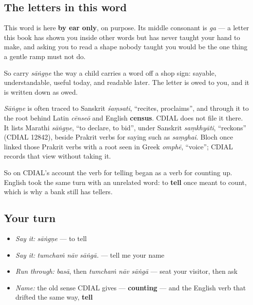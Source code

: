 \subsection*{The letters in this word}
This word is here \textbf{by ear only}, on purpose. Its middle consonant is \emph{ga} — a letter this book has shown you inside other words but has never taught your hand to make, and asking you to read a shape nobody taught you would be the one thing a gentle ramp must not do.

So carry \emph{sāṅgṇe} the way a child carries a word off a shop sign: sayable, understandable, useful today, and readable later. The letter is owed to you, and it is written down as owed.

\begin{cousinweb}
\emph{Sāṅgṇe} is often traced to Sanskrit \emph{śaṃsati}, \textquotedblleft{}recites, proclaims\textquotedblright{}, and through it to the root behind Latin \emph{cēnseō} and English \textbf{census}. CDIAL does not file it there. It lists Marathi \emph{sāṅgṇe}, \textquotedblleft{}to declare, to bid\textquotedblright{}, under Sanskrit \emph{saṃkhyāti}, \textquotedblleft{}reckons\textquotedblright{} (CDIAL 12842), beside Prakrit verbs for saying such as \emph{saṃghai}. Bloch once linked those Prakrit verbs with a root seen in Greek \emph{omphē}, \textquotedblleft{}voice\textquotedblright{}; CDIAL records that view without taking it.

So on CDIAL's account the verb for telling began as a verb for counting up. English took the same turn with an unrelated word: to \textbf{tell} once meant to count, which is why a bank still has tellers.
\end{cousinweb}

\subsection*{Your turn}
\begin{itemize}
\raggedright
  \item \emph{Say it:} \emph{sāṅgṇe} — to tell
  \item \emph{Say it:} \emph{tumchaṁ nāv sāṅgā.} — tell me your name
  \item \emph{Run through:} \emph{basā}, then \emph{tumchaṁ nāv sāṅgā} — seat your visitor, then ask
  \item \emph{Name:} the old sense CDIAL gives — \textbf{counting} — and the English verb that drifted the same way, \textbf{tell}
\end{itemize}

